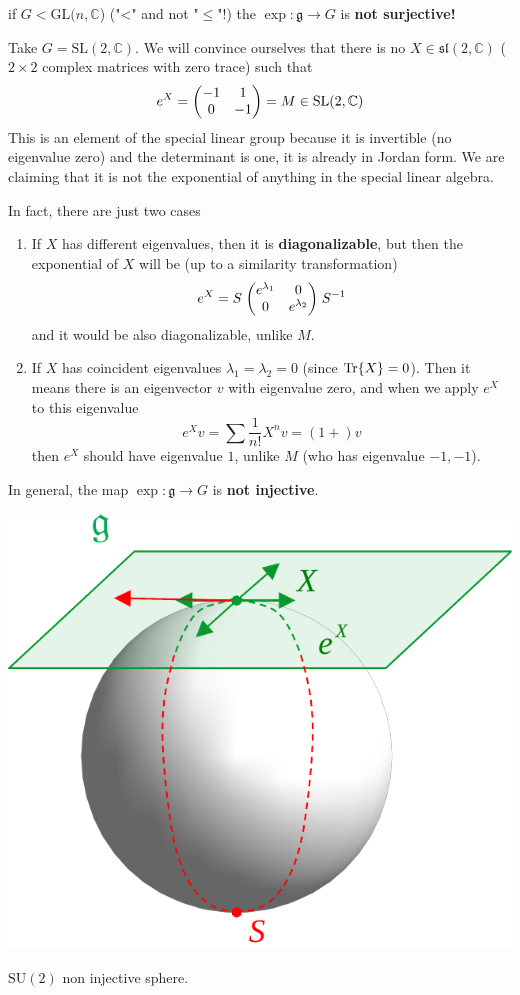 \documentclass[../main.tex]{subfiles}
\begin{document}
{ if $G<\textrm{GL}(n,\mathbb{C}$)} ("<" and not "$\leq$"!) the $\exp:\mathfrak{g}\to G$ is \textbf{not surjective!}
\begin{example}
Take $G=\textrm{SL}(2,\mathbb{C})$. We will convince ourselves that there is no $X\in\mathfrak{sl}(2,\mathbb{C})$ ($2\times 2$ complex matrices with zero trace) such that
\[
e^X=\mqty(-1 & 1 \\ 0 & -1)=M \in \textrm{SL}(2,\mathbb{C})
\]
This is an element of the special linear group because it is invertible (no eigenvalue zero) and the determinant is one, it is already in Jordan form. We are claiming that it is not the exponential of anything in the special linear algebra.

In fact, there are just two cases
\begin{enumerate}
    \item If $X$ has different eigenvalues, then it is \textbf{diagonalizable}, but then the exponential of $X$ will be (up to a similarity transformation)
    \[
    e^X=S\;\mqty(\dmat[0]{e^{\lambda_1}, e^{\lambda_2}})\;S^{-1}
    \]
    and it would be also diagonalizable, unlike $M$.
    \item If $X$ has coincident eigenvalues $\lambda_1=\lambda_2=0$ (since $\Tr{X}=0$). Then it means there is an eigenvector $v$ with eigenvalue zero, and when we apply $e^X$ to this eigenvalue 
    \[
    e^Xv=\sum\frac{1}{n!}X^nv=\left(1+\right)v
    \]
    then $e^X$ should have eigenvalue $1$, unlike $M$ (who has eigenvalue $-1,-1$).
\end{enumerate}
\end{example}
{ In general, the map $\exp:\mathfrak{g}\to G$ is \textbf{not injective}.}
\begin{marginfigure}
	\includegraphics[width=1.2\linewidth]{images/su2_not_inj.pdf}
	\caption{$\textrm{SU}(2)$ non injective sphere.}
\end{marginfigure}
\end{document}
